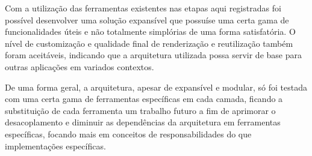 Com a utilização das ferramentas existentes nas etapas aqui registradas foi possível desenvolver uma solução expansível que possuíse uma certa gama de funcionalidades úteis e não totalmente simplórias de uma forma satisfatória. O nível de customização e qualidade final de renderização e reutilização também foram aceitáveis, indicando que a arquitetura utilizada possa servir de base para outras aplicações em variados contextos.

De uma forma geral, a arquitetura, apesar de expansível e modular, só foi testada com uma certa gama de ferramentas específicas em cada camada, ficando a substituição de cada ferramenta um trabalho futuro a fim de aprimorar o desacoplamento e diminuir as dependências da arquitetura em ferramentas específicas, focando mais em conceitos de responsabilidades do que implementações específicas.
